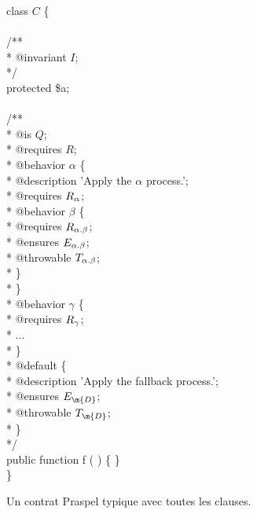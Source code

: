 \begin{figure}
\begin{bigpre}
class \(C\) \{ \\
\\
    /** \\
     * @invariant \(I\); \\
     */ \\
    protected \$a; \\
\\
    /** \\
     * @is \(Q\); \\
     * @requires \(R\); \\
     * @behavior \(\alpha\) \{ \\
     *     @description 'Apply the \(\alpha\) process.'; \\
     *     @requires \(R\sb{\alpha}\); \\
     *     @behavior \(\beta\) \{ \\
     *         @requires  \(R\sb{\alpha.\beta}\); \\
     *         @ensures   \(E\sb{\alpha.\beta}\); \\
     *         @throwable \(T\sb{\alpha.\beta}\); \\
     *     \} \\
     * \} \\
     * @behavior \(\gamma\) \{ \\
     *     @requires \(R\sb{\gamma}\); \\
     *     \(\dots\) \\
     * \} \\
     * @default \{ \\
     *     @description 'Apply the fallback process.'; \\
     *     @ensures   \(E\sb{\m{D}}\); \\
     *     @throwable \(T\sb{\m{D}}\); \\
     * \} \\
     */ \\
    public function f ( ) \{ \} \\
\}
\end{bigpre}

\caption{\label{figure:language:typical_contract} Un contrat Praspel typique
avec toutes les clauses.}

\end{figure}

